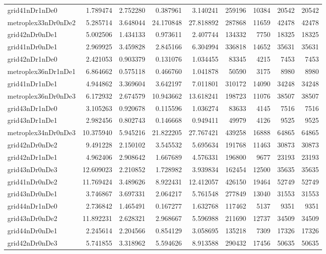 \begin{longtable}{|l|r|r|r|r|r|r|r|r|}
grid41nDr1nDe0 & 1.789474 & 2.752280 & 0.387961 & 3.140241 & 259196 & 10384 & 20542 & 20542 \\
metroplex33nDr0nDe2 & 5.285714 & 3.648044 & 24.170848 & 27.818892 & 287868 & 11659 & 42478 & 42478 \\
grid42nDr0nDe1 & 5.002506 & 1.434133 & 0.973611 & 2.407744 & 134332 & 7750 & 18325 & 18325 \\
grid41nDr0nDe1 & 2.969925 & 3.459828 & 2.845166 & 6.304994 & 336818 & 14652 & 35631 & 35631 \\
grid42nDr1nDe0 & 2.421053 & 0.903379 & 0.131076 & 1.034455 & 83345 & 4215 & 7453 & 7453 \\
metroplex36nDr1nDe1 & 6.864662 & 0.575118 & 0.466760 & 1.041878 & 50590 & 3175 & 8980 & 8980 \\
grid41nDr1nDe1 & 4.944862 & 3.369604 & 3.642197 & 7.011801 & 310172 & 14090 & 34248 & 34248 \\
metroplex36nDr0nDe3 & 6.172932 & 2.674579 & 10.943662 & 13.618241 & 198723 & 11076 & 38507 & 38507 \\
grid43nDr1nDe0 & 3.105263 & 0.920678 & 0.115596 & 1.036274 & 83633 & 4145 & 7516 & 7516 \\
grid43nDr1nDe1 & 2.982456 & 0.802743 & 0.146668 & 0.949411 & 49979 & 4126 & 9525 & 9525 \\
metroplex34nDr0nDe3 & 10.375940 & 5.945216 & 21.822205 & 27.767421 & 439258 & 16888 & 64865 & 64865 \\
grid42nDr0nDe2 & 9.491228 & 2.150102 & 3.545532 & 5.695634 & 191768 & 11463 & 30873 & 30873 \\
grid42nDr1nDe1 & 4.962406 & 2.908642 & 1.667689 & 4.576331 & 196800 & 9677 & 23193 & 23193 \\
grid43nDr0nDe3 & 12.609023 & 2.210852 & 1.728982 & 3.939834 & 162454 & 12500 & 35635 & 35635 \\
grid41nDr0nDe2 & 11.769424 & 3.489626 & 8.922431 & 12.412057 & 426150 & 19464 & 52749 & 52749 \\
grid43nDr0nDe1 & 3.746867 & 3.697331 & 2.064217 & 5.761548 & 277849 & 13040 & 31553 & 31553 \\
grid44nDr1nDe0 & 2.736842 & 1.465491 & 0.167277 & 1.632768 & 117462 & 5137 & 9351 & 9351 \\
grid43nDr0nDe2 & 11.892231 & 2.628321 & 2.968667 & 5.596988 & 211690 & 12737 & 34509 & 34509 \\
grid44nDr0nDe1 & 2.245614 & 2.204566 & 0.854129 & 3.058695 & 135218 & 7309 & 17326 & 17326 \\
grid42nDr0nDe3 & 5.741855 & 3.318962 & 5.594626 & 8.913588 & 290432 & 17456 & 50635 & 50635 \\

\end{longtable}
